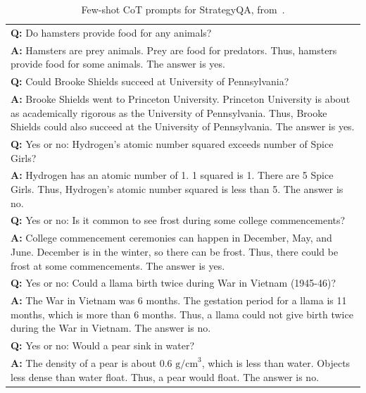 \documentclass{article} %
\begin{document}
\begin{table}[h]
    \caption{
    Few-shot CoT prompts for StrategyQA, from~\cite{Wei2022ChainOT}.
    }
    \centering
    \small
    \begin{tabular}{p{13.5cm}}
        \toprule
        \textbf{Q:} Do hamsters provide food for any animals?\\
        \vspace{-1mm}
        \textbf{A:} Hamsters are prey animals. Prey are food for predators. Thus, hamsters provide food for some animals. The answer is yes.\\
        \vspace{0mm}
        \textbf{Q:} Could Brooke Shields succeed at University of Pennsylvania?\\
        \vspace{-1mm}
        \textbf{A:} Brooke Shields went to Princeton University. Princeton University is about as academically rigorous as the University of Pennsylvania. Thus, Brooke Shields could also succeed at the University of Pennsylvania. The answer is yes.\\
        \vspace{0mm}
        \textbf{Q:} Yes or no: Hydrogen's atomic number squared exceeds number of Spice Girls?\\
        \vspace{-1mm}
        \textbf{A:} Hydrogen has an atomic number of 1. 1 squared is 1. There are 5 Spice Girls. Thus, Hydrogen's atomic number squared is less than 5. The answer is no.\\
        \vspace{0mm}
        \textbf{Q:} Yes or no: Is it common to see frost during some college commencements?\\
        \vspace{-1mm}
        \textbf{A:} College commencement ceremonies can happen in December, May, and June. December is in the winter, so there can be frost. Thus, there could be frost at some commencements. The answer is yes.\\
        \vspace{0mm}
        \textbf{Q:} Yes or no: Could a llama birth twice during War in Vietnam (1945-46)?\\
        \vspace{-1mm}
        \textbf{A:} The War in Vietnam was 6 months. The gestation period for a llama is 11 months, which is more than 6 months. Thus, a llama could not give birth twice during the War in Vietnam. The answer is no.\\
        \vspace{0mm}
        \textbf{Q:} Yes or no: Would a pear sink in water?\\
        \vspace{-1mm}
        \textbf{A:} The density of a pear is about 0.6 $\text{g/cm}^3$, which is less than water. Objects less dense than water float. Thus, a pear would float. The answer is no.\\
        \bottomrule
    \end{tabular}
    \label{tab:prompt-strategyqa}
\end{table}
\end{document}
